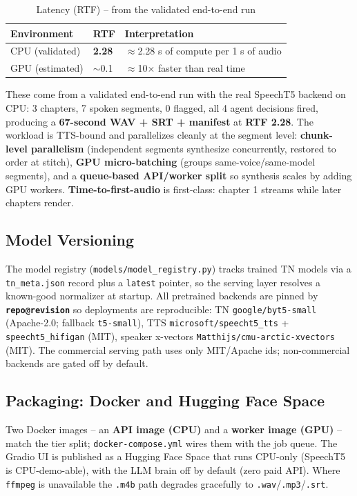 \documentclass[12pt,a4paper]{article}
\begin{document}
\begin{table}[H]
\centering
\caption{Latency (RTF) -- from the validated end-to-end run}
\begin{tabular}{llL}
\toprule
\textbf{Environment} & \textbf{RTF} & \textbf{Interpretation} \\
\midrule
CPU (validated) & \textbf{2.28} & $\approx$2.28 s of compute per 1 s of audio \\
GPU (estimated) & $\sim$0.1 & $\approx$10$\times$ faster than real time \\
\bottomrule
\end{tabular}
\end{table}

These come from a validated end-to-end run with the real SpeechT5 backend on CPU: 3 chapters, 7 spoken segments, 0 flagged, all 4 agent decisions fired, producing a \textbf{67-second WAV + SRT + manifest} at \textbf{RTF 2.28}. The workload is TTS-bound and parallelizes cleanly at the segment level: \textbf{chunk-level parallelism} (independent segments synthesize concurrently, restored to order at stitch), \textbf{GPU micro-batching} (groups same-voice/same-model segments), and a \textbf{queue-based API/worker split} so synthesis scales by adding GPU workers. \textbf{Time-to-first-audio} is first-class: chapter 1 streams while later chapters render.

\subsection{Model Versioning}

The model registry (\texttt{models/model\_registry.py}) tracks trained TN models via a \texttt{tn\_meta.json} record plus a \texttt{latest} pointer, so the serving layer resolves a known-good normalizer at startup. All pretrained backends are pinned by \textbf{\texttt{repo@revision}} so deployments are reproducible: TN \texttt{google/byt5-small} (Apache-2.0; fallback \texttt{t5-small}), TTS \texttt{microsoft/speecht5\_tts} + \texttt{speecht5\_hifigan} (MIT), speaker x-vectors \texttt{Matthijs/cmu-arctic-xvectors} (MIT). The commercial serving path uses only MIT/Apache ids; non-commercial backends are gated off by default.

\subsection{Packaging: Docker and Hugging Face Space}

Two Docker images -- an \textbf{API image (CPU)} and a \textbf{worker image (GPU)} -- match the tier split; \texttt{docker-compose.yml} wires them with the job queue. The Gradio UI is published as a Hugging Face Space that runs CPU-only (SpeechT5 is CPU-demo-able), with the LLM brain off by default (zero paid API). Where \texttt{ffmpeg} is unavailable the \texttt{.m4b} path degrades gracefully to \texttt{.wav}/\texttt{.mp3}/\texttt{.srt}.
\end{document}
